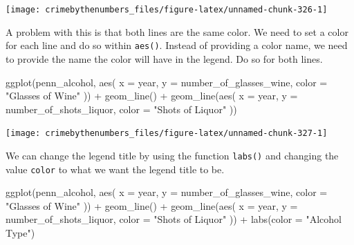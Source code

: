 \documentclass[
]{krantz}
\makeatletter
\newenvironment{Shaded}{\begin{snugshade}}{\end{snugshade}}
\newcommand{\AttributeTok}[1]{\textcolor[rgb]{0.61,0.61,0.61}{#1}}
\newcommand{\FunctionTok}[1]{\textcolor[rgb]{0,0,0}{#1}}
\newcommand{\NormalTok}[1]{#1}
\newcommand{\SpecialCharTok}[1]{\textcolor[rgb]{0,0,0}{#1}}
\newcommand{\StringTok}[1]{\textcolor[rgb]{0.5,0.5,0.5}{#1}}
\newenvironment{kframe}{%
\medskip{}
\setlength{\fboxsep}{.8em}
 \def\at@end@of@kframe{}%
 \ifinner\ifhmode%
  \def\at@end@of@kframe{\end{minipage}}%
  \begin{minipage}{\columnwidth}%
 \fi\fi%
 \def\FrameCommand##1{\hskip\@totalleftmargin \hskip-\fboxsep
 \colorbox{shadecolor}{##1}\hskip-\fboxsep
     \hskip-\linewidth \hskip-\@totalleftmargin \hskip\columnwidth}%
 \MakeFramed {\advance\hsize-\width
   \@totalleftmargin\z@ \linewidth\hsize
   \@setminipage}}%
 {\par\unskip\endMakeFramed%
 \at@end@of@kframe}
\renewenvironment{Shaded}{\begin{kframe}}{\end{kframe}}
\makeatother
\begin{document}
\begin{center}\texttt{[image: crimebythenumbers\_files/figure-latex/unnamed-chunk-326-1]} \end{center}

A problem with this is that both lines are the same color.
We need to set a color for each line and do so within
\texttt{aes()}. Instead of providing a color name, we need
to provide the name the color will have in the legend. Do so
for both lines.

\begin{Shaded}
\begin{Highlighting}[]
\FunctionTok{ggplot}\NormalTok{(penn\_alcohol, }\FunctionTok{aes}\NormalTok{(}
  \AttributeTok{x =}\NormalTok{ year,}
  \AttributeTok{y =}\NormalTok{ number\_of\_glasses\_wine,}
  \AttributeTok{color =} \StringTok{"Glasses of Wine"}
\NormalTok{)) }\SpecialCharTok{+}
  \FunctionTok{geom\_line}\NormalTok{() }\SpecialCharTok{+}
  \FunctionTok{geom\_line}\NormalTok{(}\FunctionTok{aes}\NormalTok{(}
    \AttributeTok{x =}\NormalTok{ year,}
    \AttributeTok{y =}\NormalTok{ number\_of\_shots\_liquor,}
    \AttributeTok{color =} \StringTok{"Shots of Liquor"}
\NormalTok{  ))}
\end{Highlighting}
\end{Shaded}

\begin{center}\texttt{[image: crimebythenumbers\_files/figure-latex/unnamed-chunk-327-1]} \end{center}

We can change the legend title by using the function
\texttt{labs()} and changing the value \texttt{color} to
what we want the legend title to be.

\begin{Shaded}
\begin{Highlighting}[]
\FunctionTok{ggplot}\NormalTok{(penn\_alcohol, }\FunctionTok{aes}\NormalTok{(}
  \AttributeTok{x =}\NormalTok{ year,}
  \AttributeTok{y =}\NormalTok{ number\_of\_glasses\_wine,}
  \AttributeTok{color =} \StringTok{"Glasses of Wine"}
\NormalTok{)) }\SpecialCharTok{+}
  \FunctionTok{geom\_line}\NormalTok{() }\SpecialCharTok{+}
  \FunctionTok{geom\_line}\NormalTok{(}\FunctionTok{aes}\NormalTok{(}
    \AttributeTok{x =}\NormalTok{ year,}
    \AttributeTok{y =}\NormalTok{ number\_of\_shots\_liquor,}
    \AttributeTok{color =} \StringTok{"Shots of Liquor"}
\NormalTok{  )) }\SpecialCharTok{+}
  \FunctionTok{labs}\NormalTok{(}\AttributeTok{color =} \StringTok{"Alcohol Type"}\NormalTok{)}
\end{Highlighting}
\end{Shaded}
\end{document}
